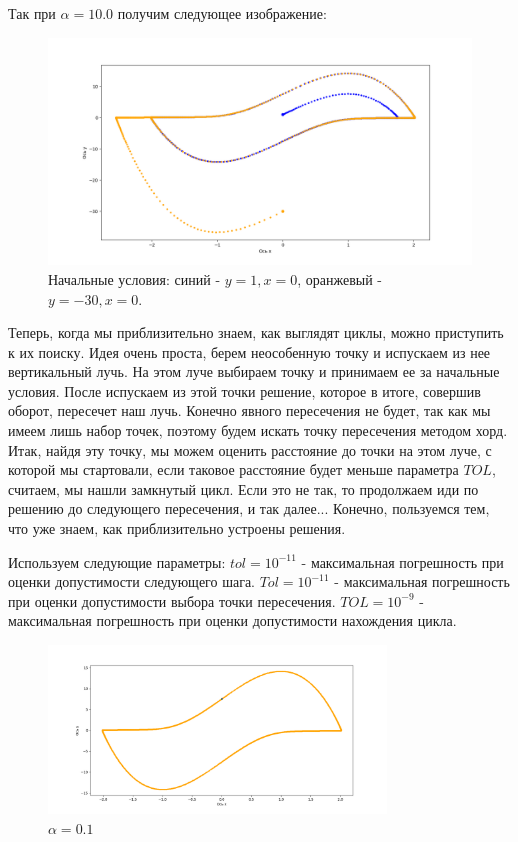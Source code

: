 \documentclass[a4paper,12pt]{article}
\begin{document}
	Так при $\alpha = 10.0$ получим следующее изображение:
	\begin{figure}[H]
		\centering
				\includegraphics[width=1\textwidth]{DEF_8_1.png}
				\caption{Начальные условия: синий - $y=1, x=0$, оранжевый - $y=-30, x=0.$}
	\end{figure}

	Теперь, когда мы приблизительно знаем, как выглядят циклы, можно приступить к их поиску. Идея очень проста, берем неособенную точку и испускаем из нее вертикальный лучь. На этом луче выбираем точку и принимаем ее за начальные условия. После испускаем из этой точки решение, которое в итоге, совершив оборот, пересечет наш лучь.
	Конечно явного пересечения не будет, так как мы имеем лишь набор точек, поэтому будем искать точку пересечения методом хорд. Итак, найдя эту точку, мы можем оценить расстояние до точки на этом луче, с которой мы стартовали, если таковое расстояние будет меньше параметра $TOL$, считаем, мы нашли замкнутый цикл. Если это не так, то продолжаем иди по решению до следующего пересечения, и так далее...
	Конечно, пользуемся тем, что уже знаем, как приблизительно устроены решения. 

  Используем следующие параметры:\newline
  $tol=10^{-11}$ - максимальная погрешность при оценки допустимости следующего шага.\newline
  $Tol=10^{-11}$ - максимальная погрешность при оценки допустимости  выбора точки пересечения.\newline
  $TOL=10^{-9}$ - максимальная погрешность при оценки допустимости нахождения цикла.\newline

	\begin{figure}[H]
		\centering
				\includegraphics[width=0.8\textwidth]{DEF_8_3.png}
        \caption{$\alpha = 0.1$}
  \end{figure}
\end{document}
